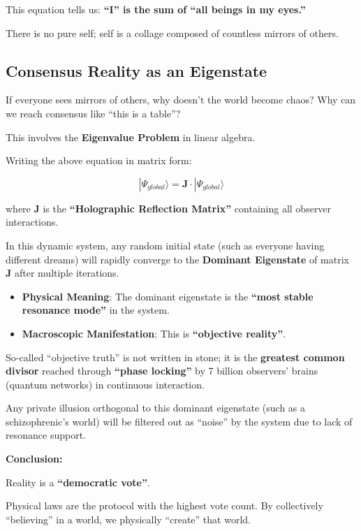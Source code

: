 This equation tells us: \textbf{``I'' is the sum of ``all beings in my eyes.''}

There is no pure self; self is a collage composed of countless mirrors of others.

\subsection{Consensus Reality as an Eigenstate}

If everyone sees mirrors of others, why doesn't the world become chaos? Why can we reach consensus like ``this is a table''?

This involves the \textbf{Eigenvalue Problem} in linear algebra.

Writing the above equation in matrix form:

\[|\Psi_{global}\rangle = \mathbf{J} \cdot |\Psi_{global}\rangle\]

where $\mathbf{J}$ is the \textbf{``Holographic Reflection Matrix''} containing all observer interactions.

In this dynamic system, any random initial state (such as everyone having different dreams) will rapidly converge to the \textbf{Dominant Eigenstate} of matrix $\mathbf{J}$ after multiple iterations.

\begin{itemize}
\item \textbf{Physical Meaning}: The dominant eigenstate is the \textbf{``most stable resonance mode''} in the system.

\item \textbf{Macroscopic Manifestation}: This is \textbf{``objective reality''}.
\end{itemize}

So-called ``objective truth'' is not written in stone; it is the \textbf{greatest common divisor} reached through \textbf{``phase locking''} by 7 billion observers' brains (quantum networks) in continuous interaction.

Any private illusion orthogonal to this dominant eigenstate (such as a schizophrenic's world) will be filtered out as ``noise'' by the system due to lack of resonance support.

\textbf{Conclusion:}

Reality is a \textbf{``democratic vote''}.

Physical laws are the protocol with the highest vote count. By collectively ``believing'' in a world, we physically ``create'' that world.

